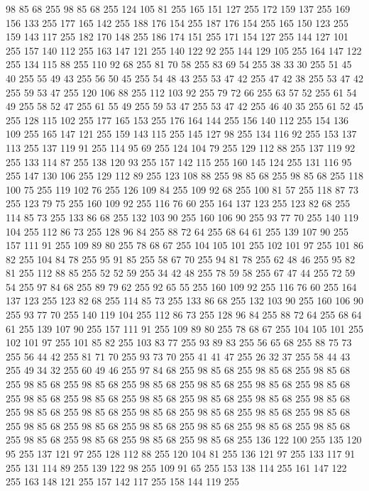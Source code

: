 98 85 68 255 98 85 68 255 124 105 81 255 165 151 127 255 172 159 137 255 169 156 133 255 177 165 142 255 188 176 154 255 187 176 154 255 165 150 123 255 159 143 117 255 182 170 148 255 186 174 151 255 171 154 127 255 144 127 101 255 157 140 112 255 163 147 121 255 140 122 92 255 144 129 105 255 164 147 122 255 134 115 88 255 110 92 68 255 81 70 58 255 83 69 54 255 38 33 30 255 51 45 40 255 55 49 43 255 56 50 45 255 54 48 43 255 53 47 42 255 47 42 38 255 53 47 42 255 59 53 47 255 120 106 88 255 112 103 92 255 79 72 66 255 63 57 52 255 61 54 49 255 58 52 47 255 61 55 49 255 59 53 47 255 53 47 42 255 46 40 35 255 61 52 45 255 128 115 102 255 177 165 153 255 176 164 144 255 156 140 112 255 154 136 109 255 165 147 121 255 159 143 115 255 145 127 98 255 134 116 92 255 153 137 113 255 137 119 91 255 114 95 69 255 124 104 79 255 129 112 88 255 137 119 92 255 133 114 87 255 138 120 93 255 157 142 115 255 160 145 124 255 131 116 95 255
147 130 106 255 129 112 89 255 123 108 88 255 98 85 68 255 98 85 68 255 118 100 75 255 119 102 76 255 126 109 84 255 109 92 68 255 100 81 57 255 118 87 73 255 123 79 75 255 160 109 92 255 116 76 60 255 164 137 123 255 123 82 68 255 114 85 73 255 133 86 68 255 132 103 90 255 160 106 90 255 93 77 70 255 140 119 104 255 112 86 73 255 128 96 84 255 88 72 64 255 68 64 61 255 139 107 90 255 157 111 91 255 109 89 80 255 78 68 67 255 104 105 101 255 102 101 97 255 101 86 82 255 104 84 78 255 95 91 85 255 58 67 70 255 94 81 78 255 62 48 46 255 95 82 81 255 112 88 85 255 52 52 59 255 34 42 48 255 78 59 58 255 67 47 44 255 72 59 54 255 97 84 68 255 89 79 62 255 92 65 55 255 160 109 92 255 116 76 60 255 164 137 123 255 123 82 68 255 114 85 73 255 133 86 68 255 132 103 90 255 160 106 90 255 93 77 70 255 140 119 104 255 112 86 73 255 128 96 84 255 88 72 64 255 68 64 61 255 139 107 90 255 157 111 91 255
109 89 80 255 78 68 67 255 104 105 101 255 102 101 97 255 101 85 82 255 103 83 77 255 93 89 83 255 56 65 68 255 88 75 73 255 56 44 42 255 81 71 70 255 93 73 70 255 41 41 47 255 26 32 37 255 58 44 43 255 49 34 32 255 60 49 46 255 97 84 68 255 98 85 68 255 98 85 68 255 98 85 68 255 98 85 68 255 98 85 68 255 98 85 68 255 98 85 68 255 98 85 68 255 98 85 68 255 98 85 68 255 98 85 68 255 98 85 68 255 98 85 68 255 98 85 68 255 98 85 68 255 98 85 68 255 98 85 68 255 98 85 68 255 98 85 68 255 98 85 68 255 98 85 68 255 98 85 68 255 98 85 68 255 98 85 68 255 98 85 68 255 98 85 68 255 98 85 68 255 98 85 68 255 98 85 68 255 98 85 68 255 98 85 68 255 136 122 100 255 135 120 95 255 137 121 97 255 128 112 88 255 120 104 81 255 136 121 97 255 133 117 91 255 131 114 89 255 139 122 98 255 109 91 65 255 153 138 114 255 161 147 122 255 163 148 121 255 157 142 117 255 158 144 119 255
